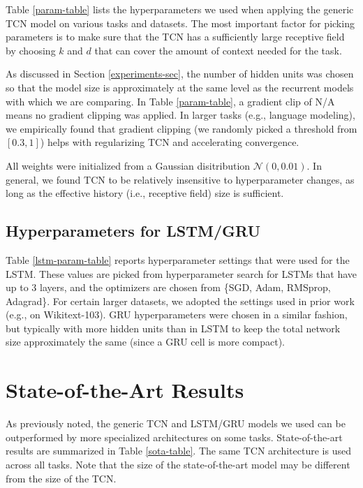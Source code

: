 \documentclass{article}
\begin{document}
Table \ref{param-table} lists the hyperparameters we used when applying the generic TCN model on various tasks and datasets. The most important factor for picking parameters is to make sure
that the TCN has a sufficiently large receptive field by choosing $k$
and $d$ that can cover the amount of context needed for the task.

As discussed in Section \ref{experiments-sec}, the number
of hidden units was chosen so that the model size is
approximately at the same level as the recurrent models with which we are comparing.
In Table \ref{param-table}, a gradient clip of N/A means no gradient clipping was
applied. In larger tasks (e.g., language modeling), we
empirically found that gradient clipping (we randomly picked a threshold from $[0.3, 1]$)
helps with regularizing TCN and accelerating convergence.

All weights were initialized from a Gaussian disitribution $\mathcal{N}(0, 0.01)$. In general, we found TCN to be relatively insensitive to hyperparameter changes, as long as the effective history (i.e., receptive field) size is sufficient.


\subsection{Hyperparameters for LSTM/GRU}


Table \ref{lstm-param-table} reports hyperparameter settings that were used for the LSTM.
These values are picked from hyperparameter search for LSTMs that have up to 3
layers, and the optimizers are chosen from \{SGD, Adam, RMSprop, Adagrad\}. For
certain larger datasets, we adopted the settings used in prior work (e.g., \citet{grave2016improving} on Wikitext-103). GRU hyperparameters were chosen in a similar fashion, but typically with more hidden units than in LSTM to keep the total
network size approximately the same (since a GRU cell is more compact).


\section{State-of-the-Art Results}

As previously noted, the generic TCN and LSTM/GRU models we used can be outperformed by more specialized architectures on some tasks. State-of-the-art results are summarized in Table \ref{sota-table}. The same TCN architecture is used across all tasks. Note that the size of the state-of-the-art model may be different from the size of the TCN.
\end{document}
